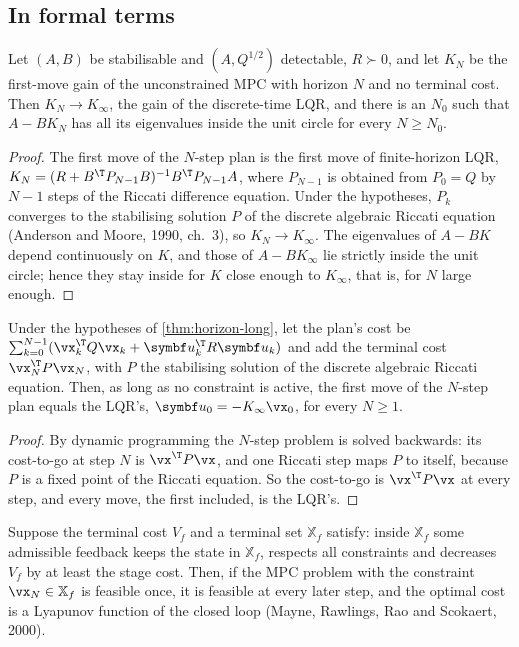 \subsection{In formal terms}

\begin{theorem}
\label{thm:horizon-long}
Let $(A, B)$ be stabilisable and $(A, Q^{1/2})$ detectable, $R \succ 0$, and let $K_N$ be the first-move gain of the unconstrained MPC with horizon $N$ and no terminal cost. Then $K_N \to K_\infty$, the gain of the discrete-time LQR, and there is an $N_0$ such that $A - BK_N$ has all its eigenvalues inside the unit circle for every $N \ge N_0$.
\end{theorem}
\begin{proof}
The first move of the $N$-step plan is the first move of finite-horizon LQR, $K_N = (R + B^\T P_{N-1}B)^{-1}B^\T P_{N-1}A$, where $P_{N-1}$ is obtained from $P_0 = Q$ by $N-1$ steps of the Riccati difference equation. Under the hypotheses, $P_k$ converges to the stabilising solution $P$ of the discrete algebraic Riccati equation (Anderson and Moore, 1990, ch.~3), so $K_N \to K_\infty$. The eigenvalues of $A - BK$ depend continuously on $K$, and those of $A - BK_\infty$ lie strictly inside the unit circle; hence they stay inside for $K$ close enough to $K_\infty$, that is, for $N$ large enough.
\end{proof}

\begin{theorem}
\label{thm:horizon-terminal}
Under the hypotheses of \cref{thm:horizon-long}, let the plan's cost be $\sum_{k=0}^{N-1}(\vx_k^\T Q\vx_k + \symbf u_k^\T R\symbf u_k)$ and add the terminal cost $\vx_N^\T P\vx_N$, with $P$ the stabilising solution of the discrete algebraic Riccati equation. Then, as long as no constraint is active, the first move of the $N$-step plan equals the LQR's, $\symbf u_0 = -K_\infty\vx_0$, for every $N \ge 1$.
\end{theorem}
\begin{proof}
By dynamic programming the $N$-step problem is solved backwards: its cost-to-go at step $N$ is $\vx^\T P\vx$, and one Riccati step maps $P$ to itself, because $P$ is a fixed point of the Riccati equation. So the cost-to-go is $\vx^\T P\vx$ at every step, and every move, the first included, is the LQR's.
\end{proof}

\begin{theorem}
\label{thm:horizon-mayne}
Suppose the terminal cost $V_f$ and a terminal set $\mathbb X_f$ satisfy: inside $\mathbb X_f$ some admissible feedback keeps the state in $\mathbb X_f$, respects all constraints and decreases $V_f$ by at least the stage cost. Then, if the MPC problem with the constraint $\vx_N \in \mathbb X_f$ is feasible once, it is feasible at every later step, and the optimal cost is a Lyapunov function of the closed loop (Mayne, Rawlings, Rao and Scokaert, 2000).
\end{theorem}


